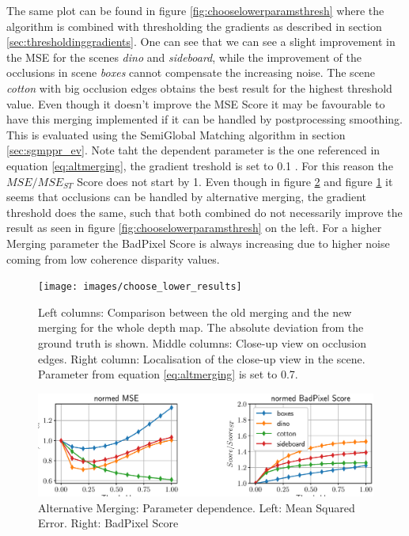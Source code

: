 \documentclass  [
  paper    = a4,
  BCOR     = 10mm,
  twoside,
  fontsize = 12pt,
  fleqn,
  toc      = bibnumbered,
  toc      = listofnumbered,
  numbers  = noendperiod,
  headings = normal,
  listof   = leveldown,
  version  = 3.03
]                                       {scrreprt}
\begin{document}
The same plot can be found in figure \ref{fig:chooselowerparamsthresh} where the algorithm is combined with thresholding the gradients as described in section \ref{sec:thresholdinggradients}. One can see that we can see a slight improvement in the MSE for the scenes \textit{dino} and \textit{sideboard}, while the improvement of the occlusions in scene \textit{boxes} cannot compensate the increasing noise. The scene \textit{cotton} with big occlusion edges obtains the best result for the highest threshold value. Even though it doesn't improve the MSE Score it may be favourable to have this merging implemented if it can be handled by postprocessing smoothing. This is evaluated using the SemiGlobal Matching algorithm in section \ref{sec:sgmppr_ev}. Note taht the dependent parameter is the one referenced in equation \ref{eq:altmerging}, the gradient treshold is set to 0.1 . For this reason the $MSE/MSE_{ST}$ Score does not start by 1. Even though in figure \ref{fig:chooselowerparams} and figure \ref{fig:chooselowerresults} it seems that occlusions can be handled by alternative merging, the gradient threshold does the same, such that both combined do not necessarily improve the result as seen in figure \ref{fig:chooselowerparamsthresh} on the left. For a higher Merging parameter the BadPixel Score is always increasing due to higher noise coming from low coherence disparity values. 


\begin{figure}
	\centering
	\texttt{[image: images/choose\_lower\_results]}
	\caption[Results from alternative merging of x- and y- direction]{Left columns: Comparison between the old merging and the new merging for the whole depth map. The absolute deviation from the ground truth is shown. Middle columns: Close-up view on occlusion edges. Right column: Localisation of the close-up view in the scene. Parameter from equation \ref{eq:altmerging} is set to 0.7.}
	\label{fig:chooselowerresults}
\end{figure}

\begin{figure}
	\centering
	\includegraphics[width=1\linewidth]{images/choose_lower_params}
	\caption[Alternative Merging: Parameter dependence]{Alternative Merging: Parameter dependence. Left: Mean Squared Error. Right: BadPixel Score}
	\label{fig:chooselowerparams}
\end{figure}
\end{document}
